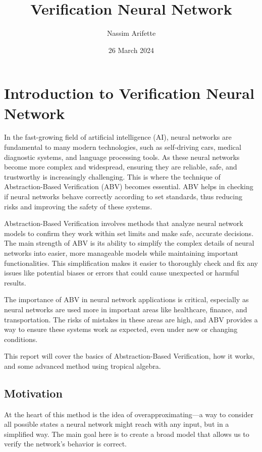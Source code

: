 \documentclass{article}
\title{Verification Neural Network}
\author{Nassim Arifette}
\date{26 March 2024}
\begin{document}
\maketitle

\section{Introduction to Verification Neural Network}

In the fast-growing field of artificial intelligence (AI), neural networks are fundamental to many modern technologies, such as self-driving cars, medical diagnostic systems, and language processing tools. As these neural networks become more complex and widespread, ensuring they are reliable, safe, and trustworthy is increasingly challenging. This is where the technique of Abstraction-Based Verification (ABV) becomes essential. ABV helps in checking if neural networks behave correctly according to set standards, thus reducing risks and improving the safety of these systems.

Abstraction-Based Verification involves methods that analyze neural network models to confirm they work within set limits and make safe, accurate decisions. The main strength of ABV is its ability to simplify the complex details of neural networks into easier, more manageable models while maintaining important functionalities. This simplification makes it easier to thoroughly check and fix any issues like potential biases or errors that could cause unexpected or harmful results.

The importance of ABV in neural network applications is critical, especially as neural networks are used more in important areas like healthcare, finance, and transportation. The risks of mistakes in these areas are high, and ABV provides a way to ensure these systems work as expected, even under new or changing conditions.

This report will cover the basics of Abstraction-Based Verification, how it works, and some advanced method using tropical algebra.

\subsection{Motivation}

At the heart of this method is the idea of overapproximating—a way to consider all possible states a neural network might reach with any input, but in a simplified way. The main goal here is to create a broad model that allows us to verify the network's behavior is correct.
\end{document}
